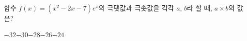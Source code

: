 함수 $f(x)=(x^2-2x-7)e^x$의 극댓값과 극솟값을 각각 $a$, $b$라 할 때, $a\times b$의 값은?
\begin{choices32}{$-32$}{$-30$}{$-28$}{$-26$}{$-24$}\end{choices32}
